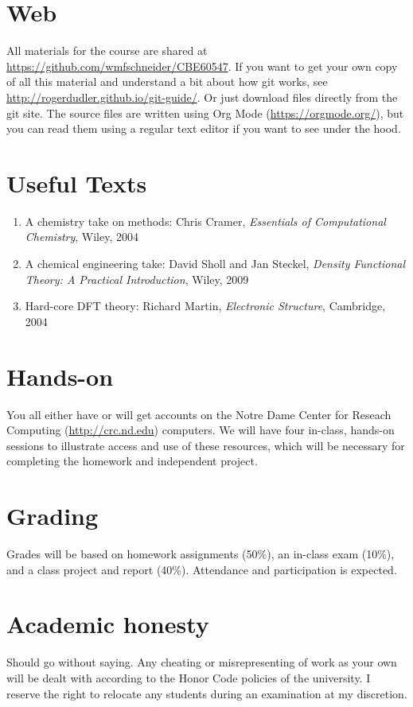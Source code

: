 \documentclass[11pt]{article}
\begin{document}
\section{Web}
\label{sec:org94efd2c}
All materials for the course are shared at \url{https://github.com/wmfschneider/CBE60547}.  If you want to get your own copy of all this material and understand a bit about how git works, see \url{http://rogerdudler.github.io/git-guide/}.  Or just download files directly from the git site. The source files are written using Org Mode (\url{https://orgmode.org/}), but you can read them using a regular text editor if you want to see under the hood.

\section{Useful Texts}
\label{sec:org7096524}
\begin{enumerate}
\item A chemistry take on methods: Chris Cramer, \emph{Essentials of Computational Chemistry}, Wiley, 2004

\item A chemical engineering take: David Sholl and Jan Steckel, \emph{Density Functional Theory: A Practical Introduction}, Wiley, 2009

\item Hard-core DFT theory: Richard Martin, \emph{Electronic Structure}, Cambridge, 2004
\end{enumerate}

\section{Hands-on}
\label{sec:orge99a845}
You all either have or will get accounts on the Notre Dame Center for Reseach Computing (\url{http://crc.nd.edu}) computers. We will have four in-class, hands-on sessions to illustrate access and use of these resources, which will be necessary for completing the homework and independent project. 

\section{Grading}
\label{sec:orgad5451c}
Grades will be based on homework assignments (50\%), an in-class exam (10\%), and a class project and report (40\%).  Attendance and participation is expected.

\section{Academic honesty}
\label{sec:org29f9ae5}
Should go without saying. Any cheating or misrepresenting of work as your own will be dealt with according to the Honor Code policies of the university. I reserve the right to relocate any students during an examination at my discretion.
\end{document}
